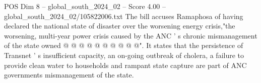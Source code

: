 \begin{textsample}{POS Dim 8 – global\_south\_2024\_02 – Score 4.00 – global\_south\_2024\_02/105822006.txt}
The bill accuses Ramaphosa of having declared the national state of disaster over the worsening energy crisis,"the worsening, multi-year power crisis caused by the ANC ' s chronic mismanagement of the state owned @ @ @ @ @ @ @ @ @ @".
It states that the persistence of Transnet ' s insufficient capacity, an on-going outbreak of cholera, a failure to provide clean water to households and rampant state capture are part of ANC governments mismanagement of the state.

\end{textsample}
